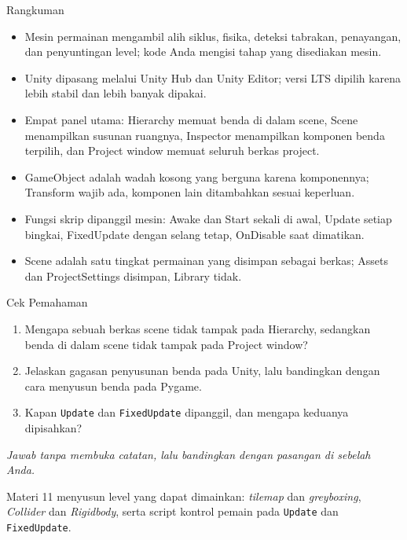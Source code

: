 \documentclass[aspectratio=169,10pt]{beamer}
\begin{document}
\begin{frame}{Rangkuman}
\begin{itemize}
  \item Mesin permainan mengambil alih siklus, fisika, deteksi tabrakan,
        penayangan, dan penyuntingan level; kode Anda mengisi tahap yang
        disediakan mesin.
  \item Unity dipasang melalui Unity Hub dan Unity Editor; versi LTS dipilih
        karena lebih stabil dan lebih banyak dipakai.
  \item Empat panel utama: Hierarchy memuat benda di dalam scene, Scene
        menampilkan susunan ruangnya, Inspector menampilkan komponen benda
        terpilih, dan Project window memuat seluruh berkas project.
  \item GameObject adalah wadah kosong yang berguna karena komponennya;
        Transform wajib ada, komponen lain ditambahkan sesuai keperluan.
  \item Fungsi skrip dipanggil mesin: Awake dan Start sekali di awal, Update
        setiap bingkai, FixedUpdate dengan selang tetap, OnDisable saat
        dimatikan.
  \item Scene adalah satu tingkat permainan yang disimpan sebagai berkas;
        Assets dan ProjectSettings disimpan, Library tidak.
\end{itemize}
\end{frame}

\begin{frame}{Cek Pemahaman}
\begin{enumerate}
  \item Mengapa sebuah berkas scene tidak tampak pada Hierarchy, sedangkan
        benda di dalam scene tidak tampak pada Project window?
  \item Jelaskan gagasan penyusunan benda pada Unity, lalu bandingkan dengan
        cara menyusun benda pada Pygame.
  \item Kapan \texttt{Update} dan \texttt{FixedUpdate} dipanggil, dan mengapa
        keduanya dipisahkan?
\end{enumerate}
\vspace{0.35cm}
{\footnotesize\color{ubMuted}\itshape Jawab tanpa membuka catatan, lalu
bandingkan dengan pasangan di sebelah Anda.}
\end{frame}

  {Materi 11 menyusun level yang dapat dimainkan: \emph{tilemap} dan
   \emph{greyboxing}, \emph{Collider} dan \emph{Rigidbody}, serta script kontrol
   pemain pada \texttt{Update} dan \texttt{FixedUpdate}.}
\end{document}
